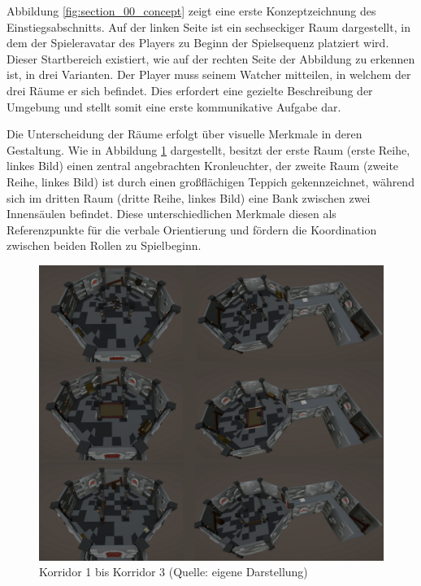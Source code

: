 Abbildung \ref{fig:section_00_concept} zeigt eine erste Konzeptzeichnung des Einstiegsabschnitts. Auf der linken Seite ist ein sechseckiger Raum dargestellt, in dem der Spieleravatar des Players zu Beginn der Spielsequenz platziert wird. Dieser Startbereich existiert, wie auf der rechten Seite der Abbildung zu erkennen ist, in drei Varianten. Der Player muss seinem Watcher mitteilen, in welchem der drei Räume er sich befindet. Dies erfordert eine gezielte Beschreibung der Umgebung und stellt somit eine erste kommunikative Aufgabe dar.

Die Unterscheidung der Räume erfolgt über visuelle Merkmale in deren Gestaltung. Wie in Abbildung \ref{fig:corridors} dargestellt, besitzt der erste Raum (erste Reihe, linkes Bild) einen zentral angebrachten Kronleuchter, der zweite Raum (zweite Reihe, linkes Bild) ist durch einen großflächigen Teppich gekennzeichnet, während sich im dritten Raum (dritte Reihe, linkes Bild) eine Bank zwischen zwei Innensäulen befindet. Diese unterschiedlichen Merkmale diesen als Referenzpunkte für die verbale Orientierung und fördern die Koordination zwischen beiden Rollen zu Spielbeginn.

\begin{figure}[ht]
\centering
\includegraphics[width=1\linewidth]{content/pictures/Room_00-Room_02-Corridor_00-Corridor_02.png}
\caption{Korridor 1 bis Korridor 3 (Quelle: eigene Darstellung)}
\label{fig:corridors}
\end{figure}


